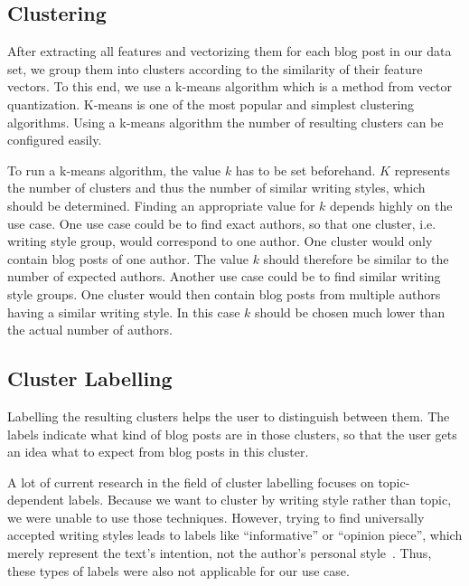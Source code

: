 
\subsection{Clustering}
\label{sec:clustering}

After extracting all features and vectorizing them for each blog post in our data set, we group them into clusters according to the similarity of their feature vectors.
To this end, we use a k-means algorithm which is a method from vector quantization.
K-means is one of the most popular and simplest clustering algorithms.
Using a k-means algorithm the number of resulting clusters can be configured easily.


To run a k-means algorithm, the value $k$ has to be set beforehand.
$K$ represents the number of clusters and thus the number of similar writing styles, which should be determined.
Finding an appropriate value for $k$ depends highly on the use case.
One use case could be to find exact authors, so that one cluster, i.e. writing style group, would correspond to one author.
One cluster would only contain blog posts of one author.
The value $k$ should therefore be similar to the number of expected authors.
Another use case could be to find similar writing style groups.
One cluster would then contain blog posts from multiple authors having a similar writing style.
In this case $k$ should be chosen much lower than the actual number of authors.

\subsection{Cluster Labelling}
\label{sec:cluster_labeling}
Labelling the resulting clusters helps the user to distinguish between them.
The labels indicate what kind of blog posts are in those clusters, so that the user gets an idea what to expect from blog posts in this cluster.


A lot of current research in the field of cluster labelling focuses on topic-dependent labels.
Because we want to cluster by writing style rather than topic, we were unable to use those techniques.
However, trying to find universally accepted writing styles leads to labels like ``informative'' or ``opinion piece'', which merely represent the text's intention, not the author's personal style~\cite{lee2001genres}.
Thus, these types of labels were also not applicable for our use case.


